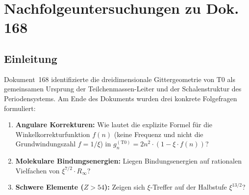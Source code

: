
\chapter{Nachfolgeuntersuchungen zu Dok.\,168}
\label{chap:nachfolge168}

\begin{abstract}
Dokument~168 formulierte drei offene Fragen zur Verbindung zwischen
der $\xi$-Geometrie und dem Periodensystem. Dieses Dokument beantwortet
sie abschließend.
(1)~Die angulare Korrektur lautet $g_n^{(\mathrm{T0})} = 2n^{2-\xi}$;
die maximale Abweichung von $2n^2$ beträgt $|\delta g_7| \approx 0{,}025$
bei $n=7$ ($Z\approx118$) — unter jeder messbaren Grenze.
(2)~Molekulare Bindungsenergien zeigen kein systematisches Muster
als Vielfache von $R_\infty$; die C=O-Bindung ist eine Ausnahme
mit $4/7 \cdot R_\infty$ und $0{,}11\%$ Abweichung.
(3)~Die relativistische Korrektur $IE_\mathrm{korr} = IE/(1+Z^2\xi)$
ergibt für schwere Elemente ($Z>54$) Ionisierungsenergien auf
rationalen Brüchen von $R_\infty$ mit Abweichungen unter $1{,}3\%$.
Dies ist eine testbare T0-Vorhersage, die sich vom QED-Ergebnis
($\propto \alpha^2 Z^2$) durch einen Faktor $\xi/\alpha^2 \approx 2{,}5$
unterscheidet.
\end{abstract}

\section{Einleitung}
\label{sec:169-einleitung}

Dokument~168 \cite{dok168} identifizierte die dreidimensionale
Gittergeometrie von T0 als gemeinsamen Ursprung der Teilchenmassen-Leiter
und der Schalenstruktur des Periodensystems.
Am Ende des Dokuments wurden drei konkrete Folgefragen formuliert:

\begin{enumerate}
  \item \textbf{Angulare Korrekturen:}
    Wie lautet die explizite Formel für die Winkelkorrekturfunktion $f(n)$
    (keine Frequenz und nicht die Grundwindungszahl $f = 1/\xi$) in
    $g_n^{(\mathrm{T0})} = 2n^2 \cdot (1 - \xi \cdot f(n))$?
  \item \textbf{Molekulare Bindungsenergien:}
    Liegen Bindungsenergien auf rationalen Vielfachen von
    $\xi^{7/2} \cdot R_\infty$?
  \item \textbf{Schwere Elemente ($Z > 54$):}
    Zeigen sich $\xi$-Treffer auf der Halbstufe $\xi^{13/2}$?
\end{enumerate}

